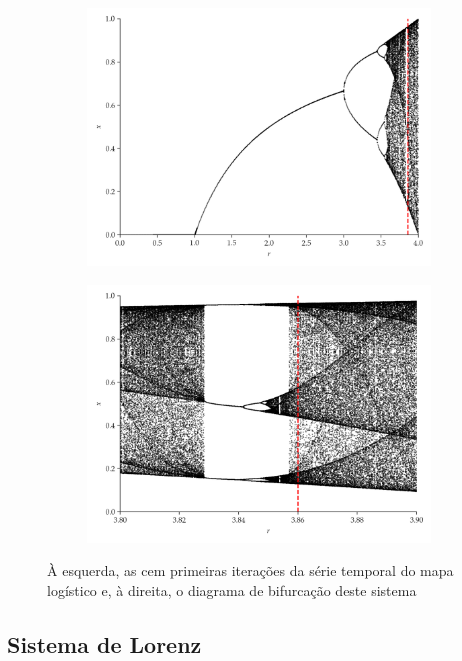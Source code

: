 \documentclass{beamer}
\begin{document}
\begin{frame}
\begin{figure}[H]
\begin{subfigure}[t]{0.3\textwidth}
         \includegraphics[scale=0.2]{mapa-logistico.png}
     \end{subfigure}
     \begin{subfigure}[t]{0.3\textwidth} 
         \includegraphics[scale=0.2]{mapa-logistico-zoom.png}
     \end{subfigure}     
     \caption{À esquerda, as cem primeiras iterações da série temporal do mapa logístico e, à direita, o diagrama de bifurcação deste sistema}
     \label{fig:logistic}
\end{figure}
\end{frame}

\subsection{Sistema de Lorenz}
\end{document}
